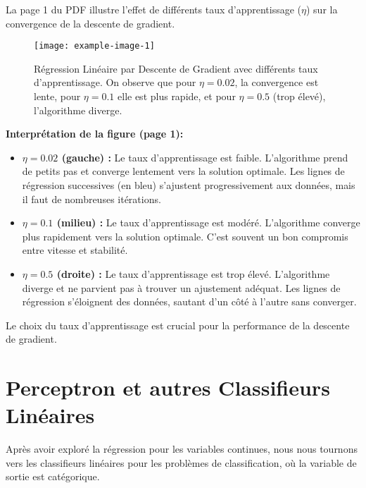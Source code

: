 \documentclass{article}
\begin{document}
La page 1 du PDF illustre l'effet de différents taux d'apprentissage ($\eta$) sur la convergence de la descente de gradient.
\begin{figure}[h!]
    \centering
    \texttt{[image: example-image-1]} %
    \caption{Régression Linéaire par Descente de Gradient avec différents taux d'apprentissage. On observe que pour $\eta=0.02$, la convergence est lente, pour $\eta=0.1$ elle est plus rapide, et pour $\eta=0.5$ (trop élevé), l'algorithme diverge.}
\end{figure}
\textbf{Interprétation de la figure (page 1):}
\begin{itemize}
    \item \textbf{$\eta = 0.02$ (gauche) :} Le taux d'apprentissage est faible. L'algorithme prend de petits pas et converge lentement vers la solution optimale. Les lignes de régression successives (en bleu) s'ajustent progressivement aux données, mais il faut de nombreuses itérations.
    \item \textbf{$\eta = 0.1$ (milieu) :} Le taux d'apprentissage est modéré. L'algorithme converge plus rapidement vers la solution optimale. C'est souvent un bon compromis entre vitesse et stabilité.
    \item \textbf{$\eta = 0.5$ (droite) :} Le taux d'apprentissage est trop élevé. L'algorithme diverge et ne parvient pas à trouver un ajustement adéquat. Les lignes de régression s'éloignent des données, sautant d'un côté à l'autre sans converger.
\end{itemize}
Le choix du taux d'apprentissage est crucial pour la performance de la descente de gradient.

\section{Perceptron et autres Classifieurs Linéaires}
Après avoir exploré la régression pour les variables continues, nous nous tournons vers les classifieurs linéaires pour les problèmes de classification, où la variable de sortie est catégorique.
\end{document}
